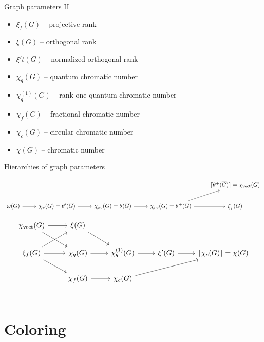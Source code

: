 \documentclass{beamer}
\renewcommand{\>}{\rangle}
\newcommand{\<}{\langle}
\begin{document}
%

\begin{frame}{Graph parameters II}
\begin{itemize}
\item $\xi_f(G)$ -- projective rank
\item $\xi(G)$ -- orthogonal rank
\item $\xi't(G)$ -- normalized orthogonal rank
\item  $\chi_q(G)$ -- quantum chromatic number
\item $\chi_q^{(1)}(G)$ -- rank one quantum chromatic number
\item $\chi_f(G)$ -- fractional chromatic number
\item $\chi_c(G)$ -- circular chromatic number
\item $\chi(G)$ -- chromatic number
\end{itemize}
\end{frame}

%

\begin{frame}[fragile]{Hierarchies of graph parameters}

{\tiny
\[
\begin{tikzcd}
                        &                        &                                                            &                                                     & \lceil \theta^+(\overline{G}) \rceil = \chi_{\mathrm{vect}}(G)  \\
\omega(G) \ar[r] & \chi_v(G)=\theta'(\overline{G}) \ar[r] &\chi_{sv}(G) = \theta(\overline{G}) \ar[r]  & \chi_{rv}(G) = \theta^+(\overline{G}) \ar[r] \ar[ru] & \xi_f(G) 
\end{tikzcd}
\]

\[
\begin{tikzcd}
\chi_{\mathrm{vect}}(G)   \ar[r] \ar[rd]         &  \xi(G)       \ar[to=2-3] \\ 
\xi_f(G ) \ar[to=2-2] \ar[to=1-2] \ar[to=3-2] &  \chi_q(G)  \ar[to=2-3]  & \chi_q^{(1)}(G) \ar[to=2-4] & \xi'(G) \ar[to=2-5] & \lceil \chi_c(G) \rceil = \chi(G) \\
                                                               &  \chi_f(G)     \ar[to=3-3] & \chi_c(G) \ar[to=2-5] \\
\end{tikzcd}
\]
}
\end{frame}

%

\section{Coloring}
\end{document}
